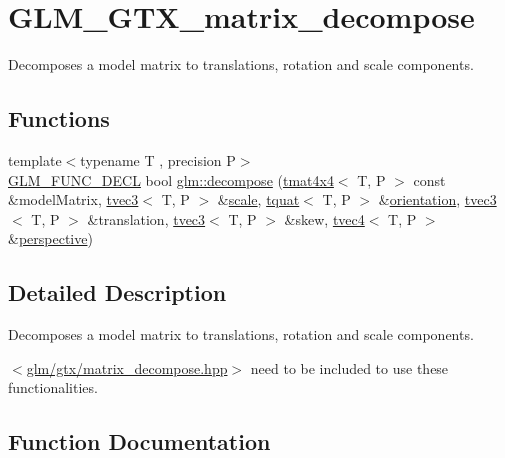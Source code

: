 \hypertarget{group__gtx__matrix__decompose}{}\section{G\+L\+M\+\_\+\+G\+T\+X\+\_\+matrix\+\_\+decompose}
\label{group__gtx__matrix__decompose}


Decomposes a model matrix to translations, rotation and scale components.  


\subsection*{Functions}
\begin{DoxyCompactItemize}
\item 
{\footnotesize template$<$typename T , precision P$>$ }\\\mbox{\hyperlink{setup_8hpp_ab2d052de21a70539923e9bcbf6e83a51}{G\+L\+M\+\_\+\+F\+U\+N\+C\+\_\+\+D\+E\+CL}} bool \mbox{\hyperlink{group__gtx__matrix__decompose_ga0f1245817507156b337798a253577c8b}{glm\+::decompose}} (\mbox{\hyperlink{structglm_1_1tmat4x4}{tmat4x4}}$<$ T, P $>$ const \&model\+Matrix, \mbox{\hyperlink{structglm_1_1tvec3}{tvec3}}$<$ T, P $>$ \&\mbox{\hyperlink{group__gtc__matrix__transform_ga8f062fcc07e2445500793f2803afebb0}{scale}}, \mbox{\hyperlink{structglm_1_1tquat}{tquat}}$<$ T, P $>$ \&\mbox{\hyperlink{group__gtx__rotate__vector_ga49b4d082305cdfcfe0a5c184f684a902}{orientation}}, \mbox{\hyperlink{structglm_1_1tvec3}{tvec3}}$<$ T, P $>$ \&translation, \mbox{\hyperlink{structglm_1_1tvec3}{tvec3}}$<$ T, P $>$ \&skew, \mbox{\hyperlink{structglm_1_1tvec4}{tvec4}}$<$ T, P $>$ \&\mbox{\hyperlink{group__gtc__matrix__transform_gac3613dcb6c6916465ad5b7ad5a786175}{perspective}})
\end{DoxyCompactItemize}


\subsection{Detailed Description}
Decomposes a model matrix to translations, rotation and scale components. 

$<$\mbox{\hyperlink{matrix__decompose_8hpp}{glm/gtx/matrix\+\_\+decompose.\+hpp}}$>$ need to be included to use these functionalities. 

\subsection{Function Documentation}
\mbox{\label{group__gtx__matrix__decompose_ga0f1245817507156b337798a253577c8b}} 
